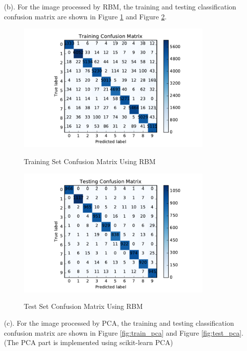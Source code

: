 (b). For the image processed by RBM, the training and testing classification confusion matrix are shown in Figure \ref{fig:train_rbm} and Figure \ref{fig:test_rbm}.

\begin{figure}[H]
\centering
\includegraphics[width=0.85\textwidth]{./figures/train_rbm.pdf}\
\caption{\label{fig:train_rbm} Training Set Confusion Matrix Using RBM}
\end{figure}

\begin{figure}[H]
\centering
\includegraphics[width=0.85\textwidth]{./figures/test_rbm.pdf}\
\caption{\label{fig:test_rbm} Test Set Confusion Matrix Using RBM}
\end{figure}

(c). For the image processed by PCA, the training and testing classification confusion matrix are shown in Figure \ref{fig:train_pca} and Figure \ref{fig:test_pca}. (The PCA part is implemented using scikit-learn PCA)

